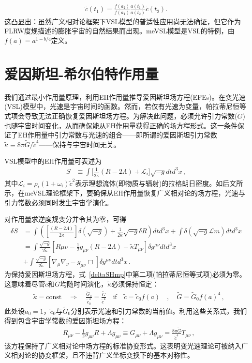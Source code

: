\documentclass[jkps,preprint,fleqn]{revtex4}
\newcommand{\tc}{\tilde{c}}
\newcommand{\tG}{\tilde{G}}
\newcommand{\tkapp}{\tilde{\kappa}}
\begin{document}
\begin{align} \tc(t_1) = \frac{f(a_2)}{f(a_1)} \frac{a(t_1)}{a(t_2)} \tc(t_2) \label{cVSL}. \end{align}这凸显出：虽然广义相对论框架下VSL模型的普适性应用尚无法确证，但它作为FLRW度规描述的膨胀宇宙的自然结果而出现。meVSL模型是VSL的特例，由$f(a) = a^{1-b/4}$定义\cite{Lee:2020zts,Lee:2023bjz}。
\section{爱因斯坦-希尔伯特作用量}\label{sec:HEaction}

我们通过最小作用量原理，利用EH作用量推导爱因斯坦场方程(EFEs)。在变光速(VSL)模型中，光速是宇宙时间的函数。然而，若仅有光速为变量，帕拉蒂尼恒等式项会导致无法正确恢复爱因斯坦场方程。为解决此问题，必须允许引力常数($\tG$)也随宇宙时间变化，从而确保能从EH作用量获得正确的场方程形式\cite{Lee:2020zts}。这一条件保证了EH作用量中引力常数与光速的组合——即所谓的爱因斯坦引力常数$\tkapp \equiv 8 \pi \tG/\tc^4$——保持与宇宙时间无关。

VSL模型中的EH作用量可表述为
\begin{align} S &\equiv \int \Biggl[ \frac{1}{2 \tkapp} \left( R - 2 \Lambda \right) + \mathcal{L}_i \Biggr] \sqrt{-g} dt d^3x \label{SHmp} \,, \end{align}
其中$\mathcal{L}_i = \rho_i (1 + \omega_i) \tc^2$表示理想流体(即物质与辐射)的拉格朗日密度。如后文所示，在meVSL理论框架下，要确保从EH作用量恢复广义相对论的场方程，光速与引力常数必须同时发生宇宙学演化。

对作用量求逆度规变分并令其为零，可得
\begin{align} \delta S &= \int \left( \left[ \frac{\left( R - 2 \Lambda \right)}{2 \tkapp} \right] \delta \left( \sqrt{-g} \right)  + \frac{1}{2\tkapp} \sqrt{-g} \delta R \right) dt d^3 x + \int \delta \left( \sqrt{-g} \mathcal{L}{m} \right) dt d^3 x \nonumber \\ &= \int \frac{\sqrt{-g}}{2 \tkapp} \left[ R{\mu\nu} - \frac{1}{2} g_{\mu\nu} \left( R - 2 \Lambda \right) - \tkapp T_{\mu\nu} \right] \delta g^{\mu\nu} dtd^3 x \nonumber \\ &+ \int \frac{\sqrt{-g}}{2 \tkapp} \left[ \nabla_{\mu} \nabla_{\nu} - g_{\mu\nu} \Box \right] \delta g^{\mu\nu} dtd^3 x \label{deltaSHmp} \,. \end{align}
为保持爱因斯坦场方程，式~\eqref{deltaSHmp}中第二项(帕拉蒂尼恒等式项)必须为零。这意味着尽管$\tc$和$\tG$均随时间演化，$\tkapp$必须保持恒定：
\begin{align}
&\tkapp = \text{const} \quad \Rightarrow \quad \frac{\tG_0}{\tc_0^4} = \frac{\tG}{\tc^4} \quad \textrm{if} \quad \tc = \tc_0 f(a) \quad , \quad \tG = \tG_{0} f(a)^4 \label{tkappaconstmp} \,,
\end{align}
此处设$a_0 = 1$，$\tc_0$与$\tG_0$分别表示光速和引力常数的当前值。利用这些关系式，我们得到包含宇宙学常数的爱因斯坦场方程：
\begin{align} &R_{\mu\nu} - \frac{1}{2} g_{\mu\nu} R + \Lambda g_{\mu\nu} \equiv G_{\mu\nu} + \Lambda g_{\mu\nu}  = \frac{8 \pi \tG}{\tc^4} T_{\mu\nu} \label{tEFEmp} \,, \end{align}
该方程保持了广义相对论中场方程的标准协变形式。这表明变光速理论可被纳入广义相对论的协变框架，且不违背广义坐标变换下的基本对称性。
\end{document}
